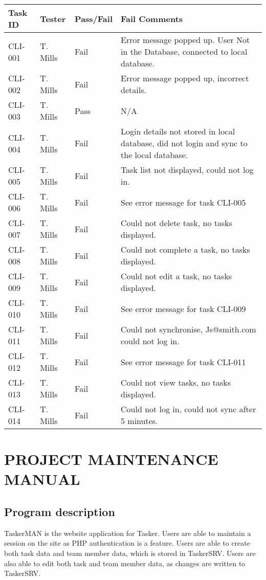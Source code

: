 \documentclass{project}
\begin{document}
\begin{longtable}{| p{1.8cm} | p{2.5cm} | p{2.5cm} | p{8.5cm} |}
\hline
Task ID & Tester & Pass/Fail &  Fail Comments \\
\hline
CLI-001 & T. Mills & Fail & Error message popped up. User Not in the Database, connected to local database.  \\
\hline
CLI-002 & T. Mills & Fail & Error message popped up, incorrect details.  \\
\hline
CLI-003 & T. Mills & Pass & N/A \\
\hline
CLI-004 & T. Mills & Fail & Login details not stored in local database, did not login and sync to the local database.  \\
\hline
CLI-005 & T. Mills & Fail & Task list not displayed, could not log in. \\
\hline
CLI-006 & T. Mills & Fail & See error message for task CLI-005  \\
\hline
CLI-007 & T. Mills & Fail & Could not delete task, no tasks displayed.  \\
\hline
CLI-008 & T. Mills & Fail & Could not complete a task, no tasks displayed.  \\
\hline
CLI-009 & T. Mills & Fail & Could not edit a task, no tasks displayed.  \\
\hline
CLI-010 & T. Mills & Fail & See error message for task CLI-009  \\
\hline
CLI-011 & T. Mills & Fail & Could not synchronise, Js@smith.com could not log in.  \\
\hline
CLI-012 & T. Mills & Fail & See error message for task CLI-011  \\
\hline
CLI-013 & T. Mills & Fail & Could not view tasks, no tasks displayed.  \\
\hline
CLI-014 & T. Mills & Fail & Could not log in, could not sync after 5 minutes. \\
\hline
\end{longtable}
\clearpage

\section{PROJECT MAINTENANCE MANUAL}
\subsection{Program description}
TaskerMAN is the website application for Tasker. Users are able to maintain a session on the site as PHP authentication is a feature. Users are able to create both task data and team member data, which is stored in TaskerSRV. Users are also able to edit both task and team member data, as changes are written to TaskerSRV.
\end{document}
